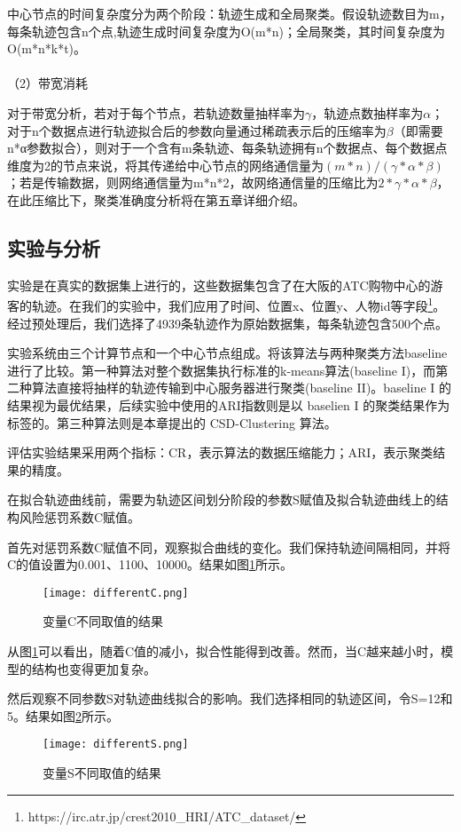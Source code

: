 中心节点的时间复杂度分为两个阶段：轨迹生成和全局聚类。假设轨迹数目为m，每条轨迹包含n个点,轨迹生成时间复杂度为O(m*n)；全局聚类，其时间复杂度为O(m*n*k*t)。\\\\
（2）带宽消耗

对于带宽分析，若对于每个节点，若轨迹数量抽样率为$\gamma$，轨迹点数抽样率为$\alpha$；对于n个数据点进行轨迹拟合后的参数向量通过稀疏表示后的压缩率为$\beta$（即需要n*α参数拟合），则对于一个含有m条轨迹、每条轨迹拥有n个数据点、每个数据点维度为2的节点来说，将其传递给中心节点的网络通信量为$(m*n)/(\gamma*\alpha*\beta)$；若是传输数据，则网络通信量为m*n*2，故网络通信量的压缩比为$2*\gamma*\alpha*\beta$，在此压缩比下，聚类准确度分析将在第五章详细介绍。

\subsection{实验与分析}
实验是在真实的数据集上进行的，这些数据集包含了在大阪的ATC购物中心的游客的轨迹。在我们的实验中，我们应用了时间、位置x、位置y、人物id等字段\footnote[1]{https://irc.atr.jp/crest2010_HRI/ATC_dataset/}。经过预处理后，我们选择了4939条轨迹作为原始数据集，每条轨迹包含500个点。

实验系统由三个计算节点和一个中心节点组成。将该算法与两种聚类方法baseline进行了比较。第一种算法对整个数据集执行标准的k-means算法(baseline I)，而第二种算法直接将抽样的轨迹传输到中心服务器进行聚类(baseline II)。baseline I 的结果视为最优结果，后续实验中使用的ARI指数则是以 baselien I 的聚类结果作为标签的。第三种算法则是本章提出的 CSD-Clustering 算法。

评估实验结果采用两个指标：CR，表示算法的数据压缩能力；ARI，表示聚类结果的精度。

在拟合轨迹曲线前，需要为轨迹区间划分阶段的参数S赋值及拟合轨迹曲线上的结构风险惩罚系数C赋值。

首先对惩罚系数C赋值不同，观察拟合曲线的变化。我们保持轨迹间隔相同，并将C的值设置为0.001、1100、10000。结果如图\ref{differentC}所示。
\begin{figure}[h]
	\texttt{[image: differentC.png]}
	\caption{变量C不同取值的结果}
	\label{differentC}
\end{figure}

从图\ref{differentC}可以看出，随着C值的减小，拟合性能得到改善。然而，当C越来越小时，模型的结构也变得更加复杂。

然后观察不同参数S对轨迹曲线拟合的影响。我们选择相同的轨迹区间，令S=12和5。结果如图\ref{differentS}所示。
\begin{figure}[h]
	\texttt{[image: differentS.png]}
	\caption{变量S不同取值的结果}
	\label{differentS}
\end{figure}

